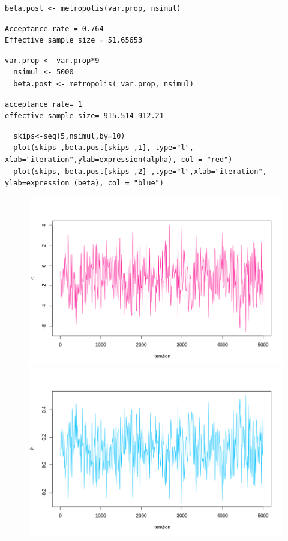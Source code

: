 \begin{lstlisting}[style=R]
beta.post <- metropolis(var.prop, nsimul)
\end{lstlisting}

{
\color{red}
\begin{Verbatim}
Acceptance rate = 0.764
Effective sample size = 51.65653
\end{Verbatim}
}

\begin{lstlisting}[style=R]
  var.prop <- var.prop*9
  nsimul <- 5000
  beta.post <- metropolis( var.prop, nsimul)
\end{lstlisting}
  
{\color{red}
\begin{verbatim}
acceptance rate= 1 
effective sample size= 915.514 912.21 
\end{verbatim}
}

\begin{lstlisting}
  skips<-seq(5,nsimul,by=10)
  plot(skips ,beta.post[skips ,1], type="l", xlab="iteration",ylab=expression(alpha), col = "red")
  plot(skips, beta.post[skips ,2] ,type="l",xlab="iteration", ylab=expression (beta), col = "blue")
  \end{lstlisting}
  
  \begin{figure}[htbp]
    \label{fig:grafici}
    \centering
    \includegraphics[width=0.8\linewidth]{img/esercizio10-2-1}%
    \qquad\qquad
    \includegraphics[width=0.8\linewidth]{img/esercizio10-2-2}
    \caption{}
  \end{figure}
  
